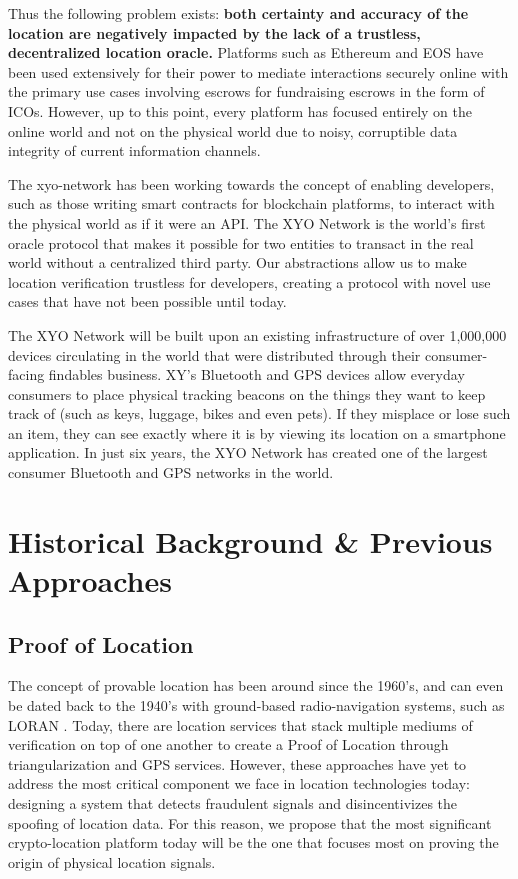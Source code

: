 \documentclass{article}
\begin{document}
\clearpage
Thus the following problem exists: \textbf{both \gls{certainty} and \gls{accuracy} of the location are negatively impacted by the lack of a trustless, decentralized location oracle.} Platforms such as Ethereum and EOS have been used extensively for their power to mediate interactions securely online with the primary use cases involving escrows for fundraising escrows in the form of ICOs. However, up to this point, every platform has focused entirely on the online world and not on the physical world due to noisy, corruptible data integrity of current information channels.

The \Gls{xyo-network} has been working towards the concept of enabling developers, such as those writing smart contracts for blockchain platforms, to interact with the physical world as if it were an API. The XYO Network is the world's first oracle protocol that makes it possible for two entities to transact in the real world without a centralized third party. Our abstractions allow us to make location verification trustless for developers, creating a protocol with novel use cases that have not been possible until today.

The XYO Network will be built upon an existing infrastructure of over 1,000,000 devices circulating in the world that were distributed through their consumer-facing findables business. XY's Bluetooth and GPS devices allow everyday consumers to place physical tracking beacons on the things they want to keep track of (such as keys, luggage, bikes and even pets). If they misplace or lose such an item, they can see exactly where it is by viewing its location on a smartphone application. In just six years, the XYO Network has created one of the largest consumer Bluetooth and GPS networks in the world.

\section{Historical Background \& Previous Approaches}
\subsection{Proof of Location}

The concept of provable location has been around since the 1960's, and can even be dated back to the 1940's with ground-based radio-navigation systems, such as LORAN \cite{blanchard-loran}. Today, there are location services that stack multiple mediums of verification on top of one another to create a Proof of Location through triangularization and GPS services. However, these approaches have yet to address the most critical component we face in location technologies today: designing a system that detects fraudulent signals and disincentivizes the spoofing of location data. For this reason, we propose that the most significant crypto-location platform today will be the one that focuses most on proving the origin of physical location signals.
\end{document}
